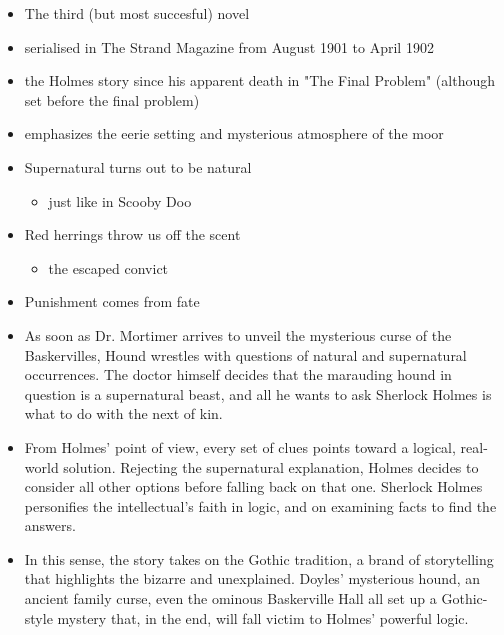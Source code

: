 \documentclass[a4paper,landscape,headrule,footrule,xetex]{foils}
\begin{document}


\begin{itemize}
\item The third (but most succesful) novel
\item serialised in The Strand Magazine from August 1901 to April 1902
\item the Holmes story since his apparent death in "The
  Final Problem" (although set before the final problem)
\item emphasizes the eerie setting and mysterious atmosphere of the
  moor
\\ 
\end{itemize}


\begin{itemize}
\item Supernatural turns out to be natural
  \begin{itemize}
  \item just like in Scooby Doo
  \end{itemize}
\item Red herrings throw us off the scent
  \begin{itemize}
  \item the escaped convict
  \end{itemize}
\item Punishment comes from fate
\\ 
\end{itemize}


\begin{itemize}
\item 
As soon as Dr. Mortimer arrives to unveil the mysterious curse of the
Baskervilles, Hound wrestles with questions of natural and
supernatural occurrences. The doctor himself decides that the
marauding hound in question is a supernatural beast, and all he wants
to ask Sherlock Holmes is what to do with the next of kin.
\item 
From Holmes' point of view, every set of clues points toward a
logical, real- world solution. Rejecting the supernatural
explanation, Holmes decides to consider all other options before
falling back on that one. Sherlock Holmes personifies the
intellectual's faith in logic, and on examining facts to find the
answers.
\item 
In this sense, the story takes on the Gothic tradition, a brand of storytelling that highlights the bizarre and unexplained. Doyles' mysterious hound, an ancient family curse, even the ominous Baskerville Hall all set up a Gothic- style mystery that, in the end, will fall victim to Holmes' powerful logic.
\end{itemize}
\end{document}
